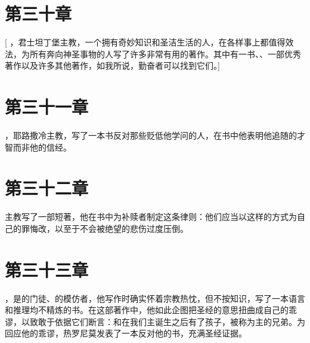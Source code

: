 \section{第三十章}

[ ，君士坦丁堡主教，一个拥有奇妙知识和圣洁生活的人，在各样事上都值得效法，为所有奔向神圣事物的人写了许多非常有用的著作。其中有一书、、一部优秀著作以及许多其他著作，如我所说，勤奋者可以找到它们。]\par


\section{第三十一章}

，耶路撒冷主教，写了一本书反对那些贬低他学问的人，在书中他表明他追随的才智而非他的信经。\par


\section{第三十二章}

主教写了一部短著，他在书中为补赎者制定这条律则：他们应当以这样的方式为自己的罪悔改，以至于不会被绝望的悲伤过度压倒。\par


\section{第三十三章}

，是的门徒、的模仿者，他写作时确实怀着宗教热忱，但不按知识，写了一本语言和推理均不精炼的书。在这部著作中，他如此企图把圣经的意思扭曲成自己的乖谬，以致敢于依据它们断言：和在我们主诞生之后有了孩子，被称为主的兄弟。为回应他的乖谬，热罗尼莫发表了一本反对他的书，充满圣经证据。\par


